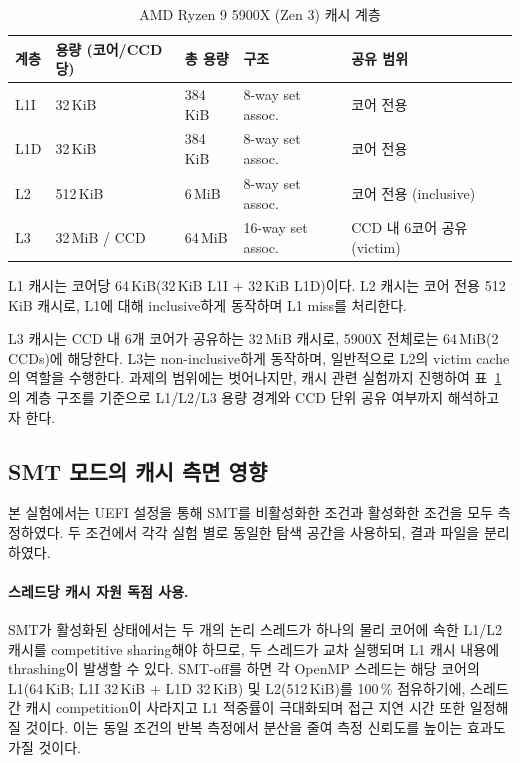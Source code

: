 \documentclass[11pt,a4paper]{article}
\begin{document}
\begin{table}[h]
\centering
\begin{tabular}{lllll}
\toprule
계층 & 용량 (코어/CCD당) & 총 용량 & 구조 & 공유 범위 \\
\midrule
L1I & 32\,KiB & 384\,KiB & 8-way set assoc. & 코어 전용 \\
L1D & 32\,KiB & 384\,KiB & 8-way set assoc. & 코어 전용 \\
L2  & 512\,KiB & 6\,MiB & 8-way set assoc. & 코어 전용 (inclusive) \\
L3  & 32\,MiB / CCD & 64\,MiB & 16-way set assoc. & CCD 내 6코어 공유 (victim) \\
\bottomrule
\end{tabular}
\caption{AMD Ryzen 9 5900X (Zen 3) 캐시 계층}
\label{tab:cache}
\end{table}

L1 캐시는 코어당 64\,KiB(32\,KiB L1I + 32\,KiB L1D)이다. L2 캐시는 코어 전용 512\,KiB 캐시로, L1에 대해 inclusive하게 동작하며 L1 miss를 처리한다.

L3 캐시는 CCD 내 6개 코어가 공유하는 32\,MiB 캐시로, 5900X 전체로는 64\,MiB(2 CCDs)에 해당한다. L3는 non-inclusive하게 동작하며, 일반적으로 L2의 victim cache의 역할을 수행한다. 과제의 범위에는 벗어나지만, 캐시 관련 실험까지 진행하여 표~\ref{tab:cache}의 계층 구조를 기준으로 L1/L2/L3 용량 경계와 CCD 단위 공유 여부까지 해석하고자 한다.

\subsection{SMT 모드의 캐시 측면 영향}

본 실험에서는 UEFI 설정을 통해 SMT를 비활성화한 조건과 활성화한 조건을 모두 측정하였다. 두 조건에서 각각 실험 별로 동일한 탐색 공간을 사용하되, 결과 파일을 분리하였다.

\paragraph{스레드당 캐시 자원 독점 사용.}
SMT가 활성화된 상태에서는 두 개의 논리 스레드가 하나의 물리 코어에 속한 L1/L2 캐시를 competitive sharing해야 하므로, 두 스레드가 교차 실행되며 L1 캐시 내용에 thrashing이 발생할 수 있다. SMT-off를 하면 각 OpenMP 스레드는 해당 코어의 L1(64\,KiB; L1I 32\,KiB + L1D 32\,KiB) 및 L2(512\,KiB)를 100\,\% 점유하기에, 스레드 간 캐시 competition이 사라지고 L1 적중률이 극대화되며 접근 지연 시간 또한 일정해질 것이다. 이는 동일 조건의 반복 측정에서 분산을 줄여 측정 신뢰도를 높이는 효과도 가질 것이다.
\end{document}

